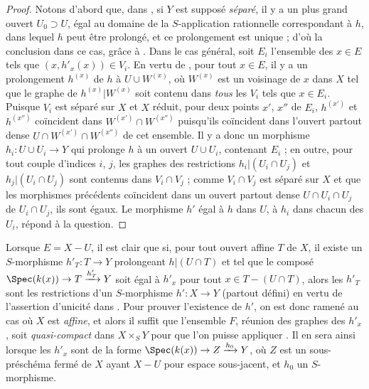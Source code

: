 \begin{proof}
Notons d'abord que, dans , si $Y$ est supposé \emph{séparé}, il y a un plus grand ouvert $U_0\supset U$, égal au domaine de la $S$-application rationnelle correspondant à $h$, dans lequel $h$ peut être prolongé, et ce prolongement est unique  ; d'où la conclusion dans ce cas, grâce à .
Dans le cas général, soit $E_i$ l'ensemble des $x\in E$ tels que $(x,h'_x(x))\in V_i$.
En vertu de , pour tout $x\in E$, il y a un prolongement $h^{(x)}$ de $h$ à $U\cup W^{(x)}$, où $W^{(x)}$ est un voisinage de $x$ dans $X$ tel que le graphe de $h^{(x)}|W^{(x)}$ soit contenu dans \emph{tous} les $V_i$ tels que $x\in E_i$.
Puisque $V_i$ est séparé sur $X$ et $X$ réduit, pour deux points $x'$, $x''$ de $E_i$, $h^{(x')}$ et $h^{(x'')}$ coïncident dans $W^{(x')}\cap W^{(x'')}$ puisqu'ils
coïncident dans l'ouvert partout dense $U\cap W^{(x')}\cap W^{(x'')}$ de cet ensemble.
Il y a donc un morphisme $h_i:U\cup U_i\to Y$ qui prolonge $h$ à un ouvert $U\cup U_i$, contenant $E_i$ ; en outre, pour tout couple d'indices $i$, $j$, les graphes des restrictions $h_i|(U_i\cap U_j)$ et $h_j|(U_i\cap U_j)$ sont contenus dans $V_i\cap V_j$ ; comme $V_i\cap V_j$ est séparé sur $X$ et que les morphismes précédents coïncident dans un ouvert partout dense $U\cap U_i\cap U_j$ de $U_i\cap U_j$, ils sont égaux.
Le morphisme $h'$ égal à $h$ dans $U$, à $h_i$ dans chacun des $U_i$, répond à la question.
\end{proof}

\begin{remark}[20.4.8]
\label{IV.20.4.8}
Lorsque $E=X-U$, il est clair que si, pour tout ouvert affine $T$ de $X$, il existe un $S$-morphisme $h'_T:T\to Y$ prolongeant $h|(U\cap T)$ et tel que le composé $\Spec(k(x))\to T\xrightarrow{h'_T}Y$ soit égal à $h'_x$ pour tout $x\in T-(U\cap T)$, alors les $h'_T$ sont les restrictions d'un $S$-morphisme $h':X\to Y$ (partout défini) en vertu de l'assertion d'unicité dans .
Pour prouver l'existence de $h'$, on est donc ramené au cas où $X$ est \emph{affine}, et alors il suffit que l'ensemble $F$, réunion des graphes des $h'_x$, soit \emph{quasi-compact} dans $X\times_S Y$ pour que l'on puisse appliquer .
Il en sera ainsi lorsque les $h'_x$ sont de la forme $\Spec(k(x))\to Z\xrightarrow{h_0}Y$, où $Z$ est un sous-préschéma fermé de $X$ ayant $X-U$ pour espace sous-jacent, et $h_0$ un $S$-morphisme.
\end{remark}

